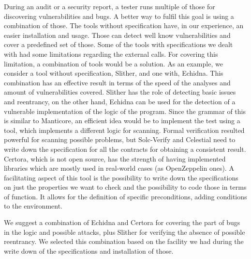 During an audit or a security report, a tester runs multiple of those for discovering vulnerabilities and bugs. 
A better way to fulfil this goal is using a combination of those. 
The tools without specification have, in our experience, an easier installation and usage. 
Those can detect well know vulnerabilities and cover a predefined set of those. 
Some of the tools with specifications we dealt with had some limitations regarding the external calls. For covering this limitation, 
a combination of tools would be a solution. 
As an example, we consider a tool without specification, Slither, and one with, Echidna. 
This combination has an effective result in terms of the speed of the analyses and amount of vulnerabilities covered. Slither has the role of detecting basic issues and reentrancy, on the other hand, Echidna can be used for the detection of a vulnerable implementation of the logic of the program. Since the grammar of this is similar to Manticore, an efficient idea would be to implement the test using a tool, which implements a different logic for scanning. 
Formal verification resulted powerful for scanning possible problems, but Solc-Verify and Celestial need to write down the specification for all the contracts for obtaining a consistent result. Certora, which is not open source, has the strength of having implemented libraries which are mostly used in real-world cases (as OpenZeppelin ones). A facilitating aspect of this tool is the possibility to write down the specifications on just the properties we want to check and the possibility to code those in terms of function. It allows for the definition of specific preconditions, adding conditions to the environment. 

We suggest a combination of Echidna and Certora for covering the part of bugs in the logic and possible attacks, 
plus Slither for verifying the absence of possible reentrancy. 
We selected this combination based on the facility we had during the write down of the specifications and installation of those.

